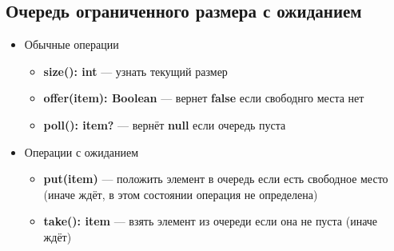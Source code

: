 \documentclass[10pt,a4paper,oneside,titlepage]{article}
\theoremstyle{plain}
\theoremstyle{defenition}
\begin{document}
\subsection{Очередь ограниченного размера с ожиданием}

\begin{itemize}
	\item Обычные операции
	\begin{itemize}
		\item {\bfseries size(): int} --- узнать текущий размер
		\item {\bfseries offer(item): Boolean} --- вернет {\bfseries false} если свободнго места нет
		\item {\bfseries poll(): item?} --- вернёт {\bfseries null} если очередь пуста
	\end{itemize}
    \item Операции с ожиданием
    \begin{itemize}
    	\item {\bfseries put(item)} --- положить элемент в очередь если есть свободное место (иначе ждёт, в этом состоянии операция не определена)
    	\item {\bfseries take(): item} --- взять элемент из очереди если она не пуста (иначе ждёт)
    \end{itemize}
\end{itemize}
\end{document}
